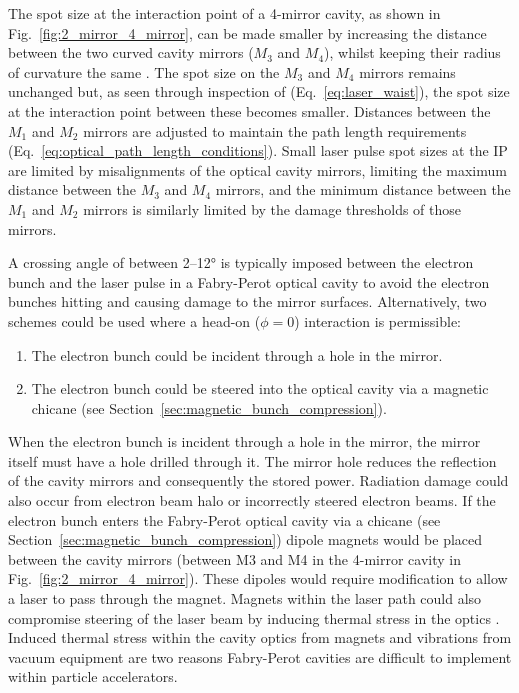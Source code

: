 \documentclass[../main.tex]{subfiles}
\begin{document}
The spot size at the interaction point of a 4-mirror cavity, as shown in Fig.~\ref{fig:2_mirror_4_mirror}, can be made smaller by increasing the distance between the two curved cavity mirrors ($M_{3}$ and $M_{4}$), whilst keeping their radius of curvature the same \cite{zomer2009polarization, akagi2016narrow}. The spot size on the $M_{3}$ and $M_{4}$ mirrors remains unchanged but, as seen through inspection of (Eq.~\ref{eq:laser_waist}), the spot size at the interaction point between these becomes smaller. Distances between the $M_{1}$ and $M_{2}$ mirrors are adjusted to maintain the path length requirements (Eq.~\ref{eq:optical_path_length_conditions}). Small laser pulse spot sizes at the IP are limited by misalignments of the optical cavity mirrors, limiting the maximum distance between the $M_{3}$ and $M_{4}$ mirrors, and the minimum distance between the $M_{1}$ and $M_{2}$ mirrors is similarly limited by the damage thresholds of those mirrors.

A crossing angle of between 2--12\si{\degree} is typically imposed between the electron bunch and the laser pulse in a Fabry-Perot optical cavity \cite{variola2011luminosity} to avoid the electron bunches hitting and causing damage to the mirror surfaces. Alternatively, two schemes could be used where a head-on ($\phi=0$) interaction is permissible:
\begin{enumerate}
    \item{The electron bunch could be incident through a hole in the mirror.}
    \item{The electron bunch could be steered into the optical cavity via a magnetic chicane (see Section~\ref{sec:magnetic_bunch_compression}). }
\end{enumerate}
When the electron bunch is incident through a hole in the mirror, the mirror itself must have a hole drilled through it. The mirror hole reduces the reflection of the cavity mirrors and consequently the stored power. Radiation damage could also occur from electron beam halo or incorrectly steered electron beams. If the electron bunch enters the Fabry-Perot optical cavity via a chicane (see Section~\ref{sec:magnetic_bunch_compression}) dipole magnets would be placed between the cavity mirrors (between M3 and M4 in the 4-mirror cavity in Fig.~\ref{fig:2_mirror_4_mirror}). These dipoles would require modification to allow a laser to pass through the magnet. Magnets within the laser path could also compromise steering of the laser beam by inducing thermal stress in the optics \cite{gunther2019device}. Induced thermal stress within the cavity optics from magnets and vibrations from vacuum equipment are two reasons Fabry-Perot cavities are difficult to implement within particle accelerators. 
\end{document}
